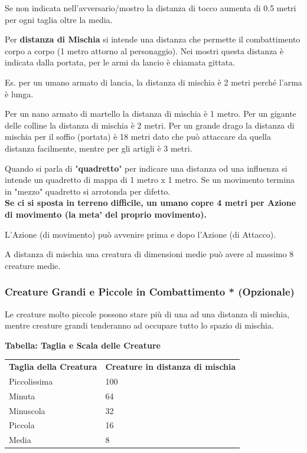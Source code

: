 \documentclass[a4paper,11pt,twoside,openany]{book}
\begin{document}
Se non indicata nell'avversario/mostro la distanza di tocco aumenta di 0.5 metri per ogni taglia oltre la media.

Per \textbf{distanza di Mischia}  si intende una distanza che permette il combattimento corpo a corpo (1 metro attorno al personaggio). Nei mostri questa distanza è indicata dalla portata, per le armi da lancio è chiamata gittata.

\begin{tcolorbox}[title = Esempi di Distanza in Combattimento] 
Es. per un umano armato di lancia, la distanza di mischia è 2 metri perché l'arma è lunga.

Per un nano armato di martello la distanza di mischia è 1 metro.
Per un gigante delle colline la distanza di mischia è 2 metri. Per un grande drago la distanza di mischia per il soffio (portata) è 18 metri dato che può attaccare da quella distanza facilmente, mentre per gli artigli è 3 metri.

\end{tcolorbox}

Quando si parla di "\textbf{quadretto}" per indicare una distanza od una influenza si intende un quadretto di mappa di 1 metro x 1 metro.
Se un movimento termina in "mezzo" quadretto si arrotonda per difetto.\\

\textbf{Se ci si sposta in terreno difficile, un umano copre 4 metri per Azione di movimento (la meta' del proprio movimento).}

L'Azione (di movimento) può avvenire prima e dopo l'Azione (di Attacco).

A distanza di mischia una creatura di dimensioni medie può avere al massimo 8 creature medie.


\subsubsection{Creature Grandi e Piccole in Combattimento {*} (Opzionale)}

\label{creature-grandi-e-piccole-in-combattimento-opzionale}

Le creature molto piccole possono stare più di una ad una distanza di mischia, mentre creature grandi tenderanno ad occupare tutto lo spazio di mischia.

\medskip

\textbf{Tabella: Taglia e Scala delle Creature}

\medskip
\begin{tabular}{ll}
	\toprule
	\textbf{Taglia della Creatura} & \textbf{Creature in distanza di mischia}\\
	Piccolissima                   & 100\\
	Minuta                         & 64\\
	Minuscola                      & 32\\
	Piccola                        & 16\\
	Media                          & 8\\
\end{tabular}
\end{document}
